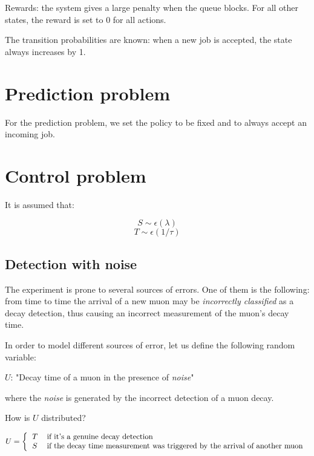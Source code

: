 \documentclass[11pt,A4paper]{article}
\begin{document}
\smallskip
Rewards: the system gives a large penalty when the queue blocks. For all other states, the reward is set to 0 for all actions.

\bigskip
The transition probabilities are known: when a new job is accepted, the state always increases by 1.


\section{Prediction problem}
For the prediction problem, we set the policy to be fixed and to always accept an incoming job.


\section{Control problem}


\newpage







\iffalse

\medskip
It is assumed that:

\[S \sim \epsilon(\lambda)\]
\[T \sim \epsilon(1/\tau)\]

\subsection{Detection with noise}
The experiment is prone to several sources of errors. One of them is the following: from time to time the arrival of a new muon may be \textit{incorrectly classified} as a decay detection, thus causing an incorrect measurement of the muon's decay time.

\medskip
In order to model different sources of error, let us define the following random variable:

$U$: "Decay time of a muon in the presence of \textit{noise}"

where the \textit{noise} is generated by the incorrect detection of a muon decay.

\medskip
How is $U$ distributed?

\[ \\
U =
\left \{
  \begin{tabular}{ll}
  $T$ & \textrm{if it's a genuine decay detection} \\
  $S$ & \textrm{if the decay time measurement was triggered by the arrival of another muon} \\
  \end{tabular}
\right.
\]
\end{document}
